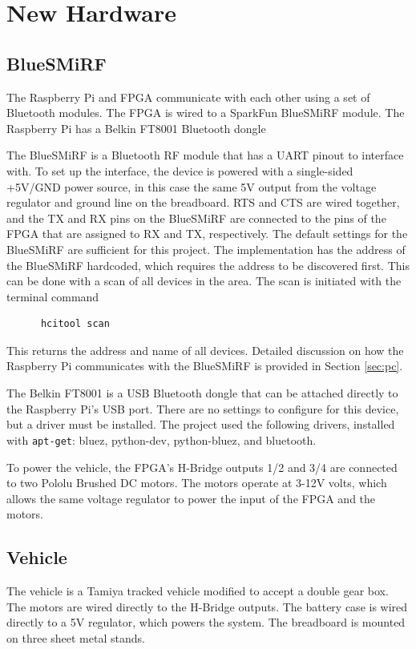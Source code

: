 \documentclass[12pt]{article}
\begin{document}
\section{New Hardware}
\subsection{BlueSMiRF}
The Raspberry Pi and FPGA communicate with each other using a set of Bluetooth modules.  The FPGA is wired to a SparkFun BlueSMiRF module.  The Raspberry Pi has a Belkin FT8001 Bluetooth dongle

The BlueSMiRF is a Bluetooth RF module that has a UART pinout to interface with.  To set up the interface, the device is powered with a single-sided +5V/GND power source, in this case the same 5V output from the voltage regulator and ground line on the breadboard.  RTS and CTS are wired together, and the TX and RX pins on the BlueSMiRF are connected to the pins of the FPGA that are assigned to RX and TX, respectively. The default settings for the BlueSMiRF are sufficient for this project. The implementation has the address of the BlueSMiRF hardcoded, which requires the address to be discovered first. This can be done with a scan of all devices in the area. The scan is initiated with the terminal command
\begin{verbatim}
      hcitool scan
\end{verbatim}
This returns the address and name of all devices. Detailed discussion on how the Raspberry Pi communicates with the BlueSMiRF is provided in Section \ref{sec:pc}.

The Belkin FT8001 is a USB Bluetooth dongle that can be attached directly to the Raspberry Pi's USB port. There are no settings to configure for this device, but a driver must be installed. The project used the following drivers, installed with \verb.apt-get.: bluez, python-dev, python-bluez, and bluetooth.

To power the vehicle, the FPGA's H-Bridge outputs 1/2 and 3/4 are connected to two Pololu Brushed DC motors.  The motors operate at 3-12V volts, which allows the same voltage regulator to power the input of the FPGA and the motors.
\subsection{Vehicle}

The vehicle is a Tamiya tracked vehicle modified to accept a double gear box. The motors are wired directly to the H-Bridge outputs. The battery case is wired directly to a 5V regulator, which powers the system. The breadboard is mounted on three sheet metal stands.
\end{document}
